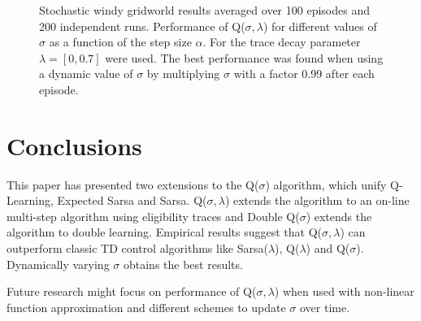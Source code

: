 \documentclass{article} %
\begin{document}
\begin{figure}
\begin{minipage}[t]{.35\textwidth}
  \label{fig:windy_gridworld}
\end{minipage}\hspace{0.5cm}
\begin{minipage}[t]{.6\textwidth}
  \caption{Stochastic windy gridworld results averaged over 100 episodes and 200 independent runs. Performance of Q($\sigma, \lambda$) for different values of $\sigma$ as a function of the step size $\alpha$. For the trace decay parameter $\lambda = [0, 0.7]$ were used. The best performance was found when using a dynamic value of $\sigma$ by multiplying $\sigma$ with a factor 0.99 after each episode.}
  \label{fig:windygrid_results}
\end{minipage}
\end{figure}

\section{Conclusions}

This paper has presented two extensions to the Q($\sigma$) algorithm, which unify Q-Learning, Expected Sarsa and Sarsa. Q($\sigma, \lambda$) extends the algorithm to an on-line multi-step algorithm using eligibility traces and Double Q($\sigma$) extends the algorithm to double learning.
Empirical results suggest that Q($\sigma, \lambda$) can outperform classic TD control algorithms like Sarsa($\lambda$), Q($\lambda$) and Q($\sigma$). Dynamically varying $\sigma$ obtains the best results.

Future research might focus on performance of Q($\sigma, \lambda$) when used with non-linear function approximation and different schemes to update $\sigma$ over time.


\end{document}
